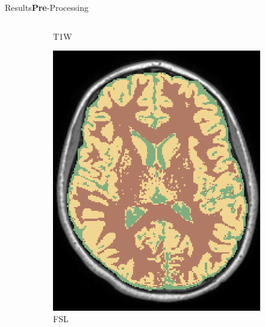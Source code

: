 \documentclass[]{standalone}
\begin{document}
\begin{frame}{Results}{\textbf{Pre}-Processing}
\begin{columns}
\begin{column}{0.67\textwidth}
\begin{figure}[h!]
\begin{subfigure}{0.32\textwidth}
					\caption*{\tiny T1W }
				\end{subfigure}
				\hfill
				\begin{subfigure}{0.32\textwidth}
					\includegraphics[scale=0.11]{./IMG/FSL_SEG48.png}
					\caption*{\tiny FSL}
				\end{subfigure}
				\hfill
				\begin{subfigure}{0.32\textwidth}

\end{subfigure}
\end{figure}
\end{column}
\end{columns}
\end{frame}
\end{document}
